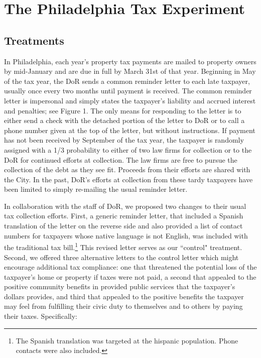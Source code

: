 \documentclass[12pt,titlepage]{article}
\begin{document}
\section{The Philadelphia Tax Experiment}

\subsection{Treatments}

In Philadelphia, each year's property tax payments are mailed to
property owners by mid-January and are due in full by March 31st of
that year.  Beginning in May of the tax year, the DoR sends a common
reminder letter to each late taxpayer, usually once every two months
until payment is received.  The common reminder letter is impersonal
and simply states the taxpayer's liability and accrued interest and
penalties; see Figure 1.  The only means for responding to the letter
is to either send a check with the detached portion of the letter to
DoR or to call a phone number given at the top of the letter, but
without instructions.  If payment has not been received by September
of the tax year, the taxpayer is randomly assigned with a 1/3
probability to either of two law firms for collection or to the DoR
for continued efforts at collection.  The law firms are free to pursue
the collection of the debt as they see fit.  Proceeds from their
efforts are shared with the City.  In the past, DoR's efforts at
collection from these tardy taxpayers have been limited to simply
re-mailing the usual reminder letter.

In collaboration with the staff of DoR, we proposed two changes to
their usual tax collection efforts.  First, a generic reminder letter,
that included a Spanish translation of the letter on the reverse side
and also provided a list of contact numbers for taxpayers whose
native language is not English, was included with the traditional tax
bill.\footnote{The Spanish translation was targeted at the hispanic
  population.  Phone contacts were also included.}  This revised
letter serves as our ``control" treatment.  Second, we offered three
alternative letters to the control letter which might encourage
additional tax compliance: one that threatened the potential loss of
the taxpayer's home or property if taxes were not paid, a second that
appealed to the positive community benefits in provided public
services that the taxpayer's dollars provides, and third that appealed
to the positive benefits the taxpayer may feel from fulfilling their
civic duty to themselves and to others by paying their taxes.
Specifically:
\end{document}
